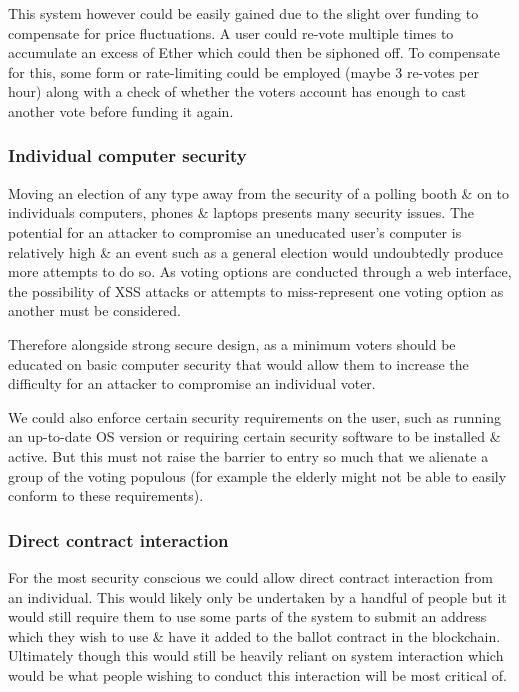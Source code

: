 \documentclass{article}
\begin{document}
	This system however could be easily gained due to the slight over funding to compensate for price fluctuations. A user could re-vote multiple times to accumulate an excess of Ether which could then be siphoned off. To compensate for this, some form or rate-limiting could be employed (maybe 3 re-votes per hour) along with a check of whether the voters account has enough to cast another vote before funding it again.
	
	\subsubsection{Individual computer security}
	Moving an election of any type away from the security of a polling booth \& on to individuals computers, phones \& laptops presents many security issues. The potential for an attacker to compromise an uneducated user's computer is relatively high \& an event such as a general election would undoubtedly produce more attempts to do so.	As voting options are conducted through a web interface, the possibility of XSS attacks or attempts to miss-represent one voting option as another must be considered.
	
	Therefore alongside strong secure design, as a minimum voters should be educated on basic computer security that would allow them to increase the difficulty for an attacker to compromise an individual voter.	
	
	We could also enforce certain security requirements on the user, such as running an up-to-date OS version or requiring certain security software to be installed \& active. But this must not raise the barrier to entry so much that we alienate a group of the voting populous (for example the elderly might not be able to easily conform to these requirements).
	
	\cleardoublepage
	\subsubsection{Direct contract interaction}
	For the most security conscious we could allow direct contract interaction from an individual. This would likely only be undertaken by a handful of people but it would still require them to use some parts of the system to submit an address which they wish to use \& have it added to the ballot contract in the blockchain. Ultimately though this would still be heavily reliant on system interaction which would be what people wishing to conduct this interaction will be most critical of.
	
\end{document}
